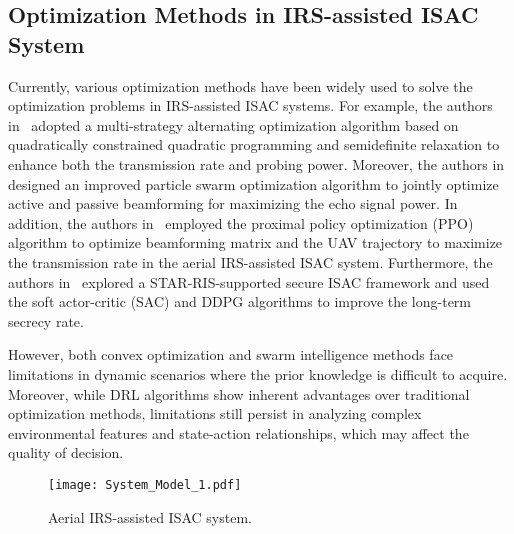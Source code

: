\subsection{Optimization Methods in IRS-assisted ISAC System}
\par Currently, various optimization methods have been widely used to solve the optimization problems in IRS-assisted ISAC systems. For example, the authors in~\cite{Hu2024} adopted a multi-strategy alternating optimization algorithm based on quadratically constrained quadratic programming and semidefinite relaxation to enhance both the transmission rate and probing power. Moreover, the authors in~\cite{Cao2023} designed an improved particle swarm optimization algorithm to jointly optimize active and passive beamforming for maximizing the echo signal power. In addition, the authors in~\cite{10594249} employed the proximal policy optimization (PPO) algorithm to optimize beamforming matrix and the UAV trajectory to maximize the transmission rate in the aerial IRS-assisted ISAC system. Furthermore, the authors in~\cite{10257639} explored a STAR-RIS-supported secure ISAC framework and used the soft actor-critic (SAC) and DDPG algorithms to improve the long-term secrecy rate.
\par However, both convex optimization and swarm intelligence methods face limitations in dynamic scenarios where the prior knowledge is difficult to acquire. Moreover, while DRL algorithms show inherent advantages over traditional optimization methods, limitations still persist in analyzing complex environmental features and state-action relationships, which may affect the quality of decision.


\begin{figure}
    \centering
    \texttt{[image: System\_Model\_1.pdf]}
    \caption{Aerial IRS-assisted ISAC system.}
    \label{fig: system model}
\end{figure}

%